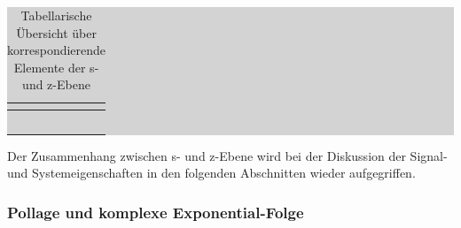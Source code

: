 \clearpage

\begin{table}[H]
\setlength{\arrayrulewidth}{.1em}
\caption{Tabellarische \"{U}bersicht \"{u}ber korrespondierende Elemente der s- und z-Ebene}
\setlength{\fboxsep}{0pt}%
\colorbox{lightgray}{%
%
\begin{tabular}{| c | c |}
\hline
\parbox[c][0.35in][c]{3.3in}{\smallskip\centering\textbf{\selectfont{s-Ebene}}} & \parbox[c][0.35in][c]{3.3in}{\smallskip\centering\textbf{\selectfont{z-Ebene}}}\\ \hline

\parbox[c][0.3in][c]{3.3in}{} & 
\parbox[c][0.3in][c]{3.3in}{}\\ \hline

\parbox[c][0.3in][c]{3.3in}{} & 
\parbox[c][0.3in][c]{3.3in}{}\\ \hline

\parbox[c][0.3in][c]{3.3in}{} & 
\parbox[c][0.3in][c]{3.3in}{}\\ \hline

\parbox[c][0.3in][c]{3.3in}{} & 
\parbox[c][0.3in][c]{3.3in}{}\\ \hline

\parbox[c][0.4in][c]{3.3in}{} & 
\parbox[c][0.4in][c]{3.3in}{}\\ \hline

\end{tabular}%
}
\label{tab:fiveone}
\end{table}

\noindent Der Zusammenhang zwischen s- und z-Ebene wird bei der Diskussion der Signal- und Systemeigenschaften in den folgenden Abschnitten wieder aufgegriffen.

\subsubsection{Pollage und komplexe Exponential-Folge}

